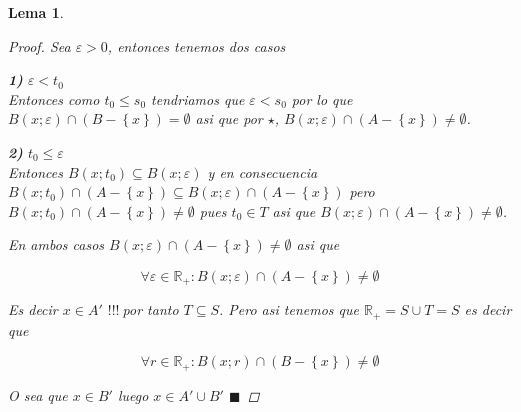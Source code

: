 \documentclass[oneside]{book} %
\theoremstyle{Teorema}
\newtheorem{Lema}[Definicion]{Lema}
\theoremstyle{Ejemplos}
\theoremstyle{[Obs]}
\renewcommand{\{}{\left\lbrace} %
\renewcommand{\}}{\right\rbrace} %
\renewcommand{\u}{\cup} %
\newcommand{\n}{\cap} %
\renewcommand{\sc}{\subseteq} %
\newcommand{\R}{\mathbb{R}} %
\renewcommand{\qed}{$\blacksquare$} %
\renewcommand{\c}{$!!!\ $} %
\begin{document}
\begin{Lema}
\begin{proof}
					Sea $\varepsilon > 0$, entonces tenemos dos casos 

					\textbf{1)} $\varepsilon < t_0$ \\ 
					Entonces como $t_0 \leq s_0$ tendriamos que $\varepsilon < s_0$ por lo que $B(x;\varepsilon) \n (B - \{ x \}) = \emptyset$ asi que por $\star$, $B(x;\varepsilon) \n (A - \{ x \}) \neq \emptyset$.

					\textbf{2)} $t_0 \leq \varepsilon$ \\ 
					Entonces $B(x;t_0) \sc B(x;\varepsilon)$ y en consecuencia $B(x;t_0) \n (A - \{ x \}) \sc B(x;\varepsilon) \n (A - \{ x \})$ pero $B(x;t_0) \n (A - \{ x \}) \neq \emptyset$ pues $t_0 \in T$ asi que $B(x;\varepsilon) \n (A - \{ x \}) \neq \emptyset$.
					
					En ambos casos $B(x;\varepsilon) \n (A - \{ x \}) \neq \emptyset$ asi que 

					\[ \forall \varepsilon \in \R_{+} : B(x;\varepsilon) \n (A - \{ x \}) \neq \emptyset \]

					Es decir $x \in A'$ \c por tanto $T \sc S$. Pero asi tenemos que $\R_{+} = S \u T = S$ es decir que 

					\[ \forall r \in \R_{+} : B(x;r) \n (B - \{ x \}) \neq \emptyset \]

					O sea que $x \in B'$ luego $x \in A' \u B'$ \qed

				\end{proof}

			\end{Lema}
\end{document}
